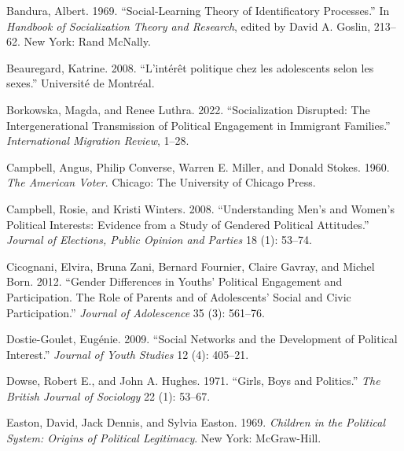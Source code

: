 \documentclass[
  letterpaper,
  DIV=11,
  numbers=noendperiod]{scrreprt}
\newlength{\cslhangindent}
\newlength{\cslentryspacingunit} %
\newenvironment{CSLReferences}[2] %
 {%
  \setlength{\parindent}{0pt}
  \ifodd #1
  \let\oldpar\par
  \def\par{\hangindent=\cslhangindent\oldpar}
  \fi
  \setlength{\parskip}{#2\cslentryspacingunit}
 }%
 {}
\begin{document}
\hypertarget{refs-4}{}
\begin{CSLReferences}{1}{0}
\leavevmode{}%
Bandura, Albert. 1969. {``{Social-Learning Theory of Identificatory
Processes}.''} In \emph{{Handbook of Socialization Theory and
Research}}, edited by David A. Goslin, 213--62. New York: Rand McNally.

\leavevmode{}%
Beauregard, Katrine. 2008. {``{L'intérêt politique chez les adolescents
selon les sexes}.''} Université de Montréal.

\leavevmode{}%
Borkowska, Magda, and Renee Luthra. 2022. {``{Socialization Disrupted:
The Intergenerational Transmission of Political Engagement in Immigrant
Families}.''} \emph{{International Migration Review}}, 1--28.

\leavevmode{}%
Campbell, Angus, Philip Converse, Warren E. Miller, and Donald Stokes.
1960. \emph{{The American Voter}}. Chicago: The University of Chicago
Press.

\leavevmode{}%
Campbell, Rosie, and Kristi Winters. 2008. {``{Understanding Men's and
Women's Political Interests: Evidence from a Study of Gendered Political
Attitudes}.''} \emph{Journal of Elections, Public Opinion and Parties}
18 (1): 53--74.

\leavevmode{}%
Cicognani, Elvira, Bruna Zani, Bernard Fournier, Claire Gavray, and
Michel Born. 2012. {``{Gender Differences in Youths' Political
Engagement and Participation. The Role of Parents and of Adolescents'
Social and Civic Participation}.''} \emph{Journal of Adolescence} 35
(3): 561--76.

\leavevmode{}%
Dostie-Goulet, Eugénie. 2009. {``{Social Networks and the Development of
Political Interest}.''} \emph{Journal of Youth Studies} 12 (4): 405--21.

\leavevmode{}%
Dowse, Robert E., and John A. Hughes. 1971. {``{Girls, Boys and
Politics}.''} \emph{The British Journal of Sociology} 22 (1): 53--67.

\leavevmode{}%
Easton, David, Jack Dennis, and Sylvia Easton. 1969. \emph{{Children in
the Political System: Origins of Political Legitimacy}}. New York:
McGraw-Hill.


\end{CSLReferences}
\end{document}
